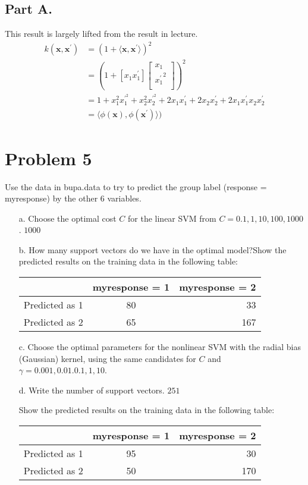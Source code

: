 \documentclass{article}
\begin{document}
\subsection*{Part A.}
This result is largely lifted from the result in lecture.
\begin{align*}
      k(\mathbf{x},\mathbf{x}^\prime) &= (1 + \langle\mathbf{x},\mathbf{x}^\prime\rangle)^2\\
      &=(1 + [x_1x_1^\prime]\begin{bmatrix}x_1\\{x_1^\prime}^2\\\end{bmatrix})^2\\
        &=1 + x_1^2x^{\prime^2}_1 + x_2^2x^{\prime^2}_2 + 2x_1x_1^{\prime} + 2x_2x_2^{\prime} + 2x_1x^{\prime}_1x_2x^{\prime}_2\\
      &= \langle\phi(\mathbf{x}),\phi(\mathbf{x}^\prime)\rangle) 
\end{align*}


\clearpage
\section*{Problem 5}
    Use the data in bupa.data to try to predict the group label (response = myresponse) by the other 6 variables.
    \begin{enumerate}
    \item[a.]
      Choose the optimal cost $C$ for the linear SVM from $C = 0.1,1,10,100,1000$. $\boxed{1000}$      
      
	\item[b.]
      How many support vectors do we have in the optimal model?Show the predicted results on the training data in the following table:
      
      \begin{tabular}{|l|c|r|}
        \hline
        & myresponse = 1 & myresponse = 2\\
        \hline
        Predicted as 1 & 80 & 33 \\
        \hline
        Predicted as 2 & 65 & 167 \\
        \hline
      \end{tabular}
    \item[c.]
      Choose the optimal parameters for the nonlinear SVM with the radial bias (Gaussian) kernel, using the same candidates for $C$ and $\gamma = 0.001,0.01.0.1,1,10$.
    \item[d.]
      Write the number of support vectors. $\boxed{251}$
      
      Show the predicted results on the training data in the following table:
    \item[]
      \begin{tabular}{|l|c|r|}
        \hline
        & myresponse = 1 & myresponse = 2\\
        \hline
        Predicted as 1 & 95 & 30\\
        \hline
        Predicted as 2 & 50 & 170\\
        \hline
      \end{tabular}
      \end{enumerate}
\end{document}
